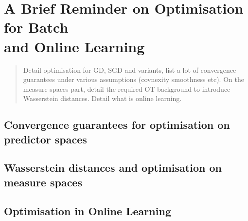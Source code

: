 \chapter[A Brief Reminder on Optimisation for Batch and Online Learning]{A Brief Reminder on Optimisation for Batch \\and Online Learning}
\label{chap:optim}
\addchapterlof
\addchapterloe
\addchapterloa

\minitoc

\begin{abstract}
    Detail optimisation for GD, SGD and variants, list a lot of convergence guarantees under various assumptions (covnexity smoothness etc). On the measure spaces part, detail the required OT background to introduce Wasserstein distances. Detail what is online learning.
\end{abstract}

\newpage

\section{Convergence guarantees for optimisation on predictor spaces}

\section{Wasserstein distances and optimisation on measure spaces}

\section{Optimisation in Online Learning}
